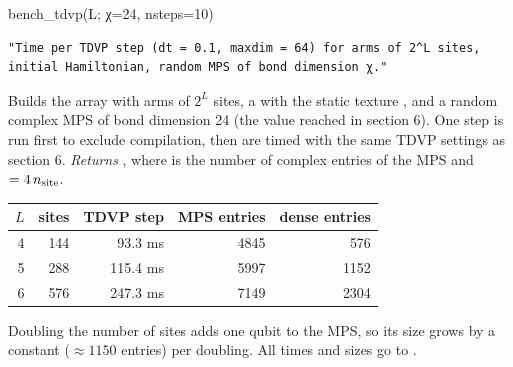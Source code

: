 \begin{function}{bench\_tdvp(L; χ=24, nsteps=10)}
\begin{Verbatim}
"Time per TDVP step (dt = 0.1, maxdim = 64) for arms of 2^L sites, initial Hamiltonian, random MPS of bond dimension χ."
\end{Verbatim}
Builds the array with arms of $2^L$ sites, a  with the static texture , and a random complex MPS of bond dimension
24 (the value reached in section 6). One step is run first to exclude compilation, then  are timed with the same TDVP settings
as section 6. \emph{Returns} , where  is the number of complex entries of
the MPS and  $= 4\,n_{\rm site}$.

\begin{center}
\begin{tabular}{rrrrr}
\toprule
$L$ & sites & TDVP step & MPS entries & dense entries\\
\midrule
4 & 144 & 93.3 ms & 4845 & 576\\
5 & 288 & 115.4 ms & 5997 & 1152\\
6 & 576 & 247.3 ms & 7149 & 2304\\
\bottomrule
\end{tabular}
\end{center}
Doubling the number of sites adds one qubit to the MPS, so its size grows by a constant ($\approx1150$ entries) per doubling. All times and
sizes go to .
\end{function}
